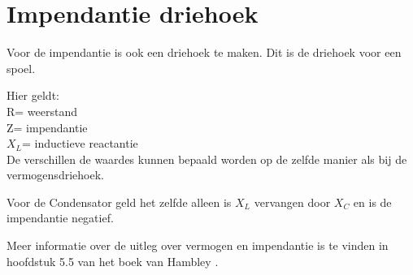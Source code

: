 \section{Impendantie driehoek}
Voor de impendantie is ook een driehoek te maken. Dit is de driehoek voor een spoel.

\begin{center}

\end{center}

Hier geldt:\\
R= weerstand\\
Z= impendantie\\
$X_L$= inductieve reactantie\\

De verschillen de waardes kunnen bepaald worden op de zelfde manier als bij de vermogensdriehoek.

\vspace{5mm}

Voor de Condensator geld het zelfde alleen is $X_L$ vervangen door $X_C$ en is de impendantie negatief.

\begin{center}

\end{center}

Meer informatie over de uitleg over vermogen en impendantie is te vinden in hoofdstuk 5.5 van het boek van Hambley 
\cite{leerboek}.